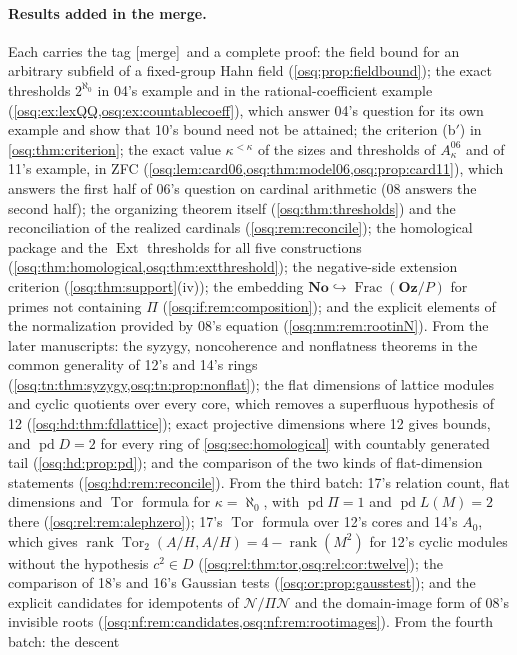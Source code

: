 \documentclass[11pt,letterpaper]{article}
\numberwithin{equation}{section}
\theoremstyle{definition}
\theoremstyle{remark}
\theoremstyle{plain}
\newcommand{\No}{\mathbf{No}}
\newcommand{\Oz}{\mathbf{Oz}}
\newcommand{\NN}{\mathcal N}         %
\newcommand{\Frac}{\operatorname{Frac}}
\newcommand{\Tor}{\operatorname{Tor}}
\newcommand{\Ext}{\operatorname{Ext}}
\newcommand{\pd}{\operatorname{pd}}
\newcommand{\rk}{\operatorname{rank}}
\newcommand{\merge}{\textup{\textsf{[merge]}}}
\begin{document}
\paragraph{Results added in the merge.} Each carries the tag \merge\ and a complete proof:
the field bound for an arbitrary subfield of a fixed-group Hahn field
(\cref{osq:prop:fieldbound}); the exact thresholds $2^{\aleph_0}$ in 04's example and in the
rational-coefficient example (\cref{osq:ex:lexQQ,osq:ex:countablecoeff}), which answer 04's
question for its own example and show that 10's bound need not be attained; the criterion (b$'$) in \cref{osq:thm:criterion};
the exact value $\kappa^{<\kappa}$ of the sizes and thresholds of $A^{06}_\kappa$ and of 11's
example, in ZFC (\cref{osq:lem:card06,osq:thm:model06,osq:prop:card11}), which answers the first
half of 06's question on cardinal arithmetic (08 answers the second half); the organizing
theorem itself (\cref{osq:thm:thresholds}) and the reconciliation of the realized cardinals
(\cref{osq:rem:reconcile}); the homological package and the $\Ext$ thresholds for all five
constructions (\cref{osq:thm:homological,osq:thm:extthreshold}); the negative-side extension
criterion (\cref{osq:thm:support}(iv)); the embedding $\No\hookrightarrow\Frac(\Oz/P)$ for primes
not containing $\Pi$ (\cref{osq:if:rem:composition}); and the explicit elements of the
normalization provided by 08's equation (\cref{osq:nm:rem:rootinN}). From the later manuscripts:
the syzygy, noncoherence and nonflatness theorems in the common generality of 12's and 14's rings
(\cref{osq:tn:thm:syzygy,osq:tn:prop:nonflat}); the flat dimensions of lattice modules and cyclic quotients over
every core, which removes a superfluous hypothesis of 12 (\cref{osq:hd:thm:fdlattice}); exact projective dimensions
where 12 gives bounds, and $\pd D=2$ for every ring of \cref{osq:sec:homological} with countably generated tail
(\cref{osq:hd:prop:pd}); and the comparison of the two kinds of flat-dimension statements
(\cref{osq:hd:rem:reconcile}). From the third batch: 17's relation count, flat dimensions and $\Tor$ formula for
$\kappa=\aleph_0$, with $\pd\Pi=1$ and $\pd L(M)=2$ there (\cref{osq:rel:rem:alephzero}); 17's $\Tor$ formula over 12's
cores and 14's $A_0$, which gives $\rk\Tor_2(A/H,A/H)=4-\rk(M^2)$ for 12's cyclic modules without the hypothesis $c^2\in D$
(\cref{osq:rel:thm:tor,osq:rel:cor:twelve}); the comparison of 18's and 16's Gaussian tests (\cref{osq:or:prop:gausstest}); and
the explicit candidates for idempotents of $\NN/\Pi\NN$ and the domain-image form of 08's invisible roots
(\cref{osq:nf:rem:candidates,osq:nf:rem:rootimages}). From the fourth batch: the descent
\end{document}
